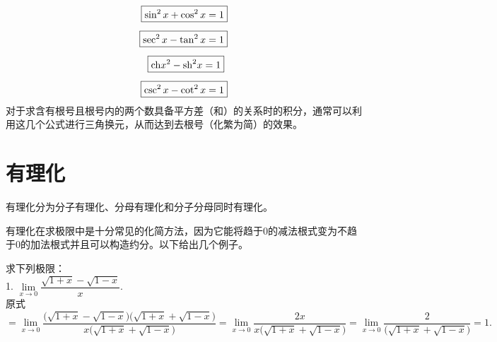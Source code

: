 \begin{tcolorbox}[title=补充：平方差（和）为1的重要公式]
	\begin{align}
		\boxed{\sin^2 x + \cos^2 x = 1} \\[0.5em]
		\boxed{\sec^2 x - \tan^2 x = 1} \\[0.5em]
		\boxed{\text{ch} x^2 - \text{sh}^2 x = 1}\,\, \\[0.5em]
		\boxed{\csc^2 x - \cot^2 x = 1}
	\end{align}
	\qquad 对于求含有根号且根号内的两个数具备平方差（和）的关系时的积分，通常可以利用这几个公式进行三角换元，从而达到去根号（化繁为简）的效果。
\end{tcolorbox}
\vspace*{0.5em}

\section{有理化}
有理化分为分子有理化、分母有理化和分子分母同时有理化。

有理化在求极限中是十分常见的化简方法，因为它能将趋于0的减法根式变为不趋于0的加法根式并且可以构造约分。以下给出几个例子。

\examples 求下列极限：\\[1em]
1. $\displaystyle \lim\limits_{x \to 0} \dfrac{\sqrt{1+x} - \sqrt{1-x}}{x}$.\\[1em]
\solve 原式$\displaystyle = \lim \limits_{x \to 0} \dfrac{\big(\sqrt{1+x} - \sqrt{1-x} \big)\big(\sqrt{1+x} + \sqrt{1-x}\big)}{x\big( \sqrt{1+x} + \sqrt{1-x} \big)} = \lim \limits_{x \to 0} \dfrac{2x}{x\big( \sqrt{1+x} + \sqrt{1-x} \big)} = \lim \limits_{x \to 0} \dfrac{2}{\big( \sqrt{1+x} + \sqrt{1-x} \big)} = 1.$













